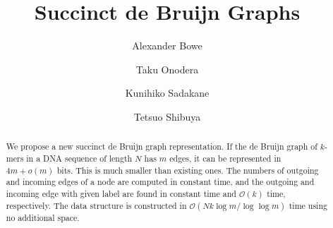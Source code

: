 \documentclass{llncs}
\newcommand{\Order}{\mathcal{O}}
\newcommand{\order}{o}
\begin{document}
\mainmatter  %

\title{Succinct de Bruijn Graphs}


%
%
\author{
  Alexander Bowe
\and
  Taku Onodera
\and
  Kunihiko Sadakane
\and
  Tetsuo Shibuya
}





\maketitle


\begin{abstract}
We propose a new succinct de Bruijn graph representation.  
If the de Bruijn graph of $k$-mers in a DNA sequence of length $N$ has $m$ edges,
it can be represented in $4m + \order(m)$ bits.
This is much smaller than existing ones.
The numbers of outgoing and incoming edges of a node are computed in constant time, and
the outgoing and incoming edge with given label are found in constant time
and $\Order(k)$ time, respectively.
The data structure is constructed in $\Order(Nk \log m/\log\log m)$
time using no additional space.  
\end{abstract}



\def\child{\textit{outgoing}}
\def\parent{\textit{incoming}}
\def\cdeg{\textit{outdegree}}
\def\pdeg{\textit{indegree}}
\def\cedge{\textit{cedge}}
\def\search{\textit{index}}
\def\last{\textit{last}}
\def\Node{\textit{Node}}
\def\fwd{\textit{fwd}}
\def\bwd{\textit{bwd}}
\end{document}
